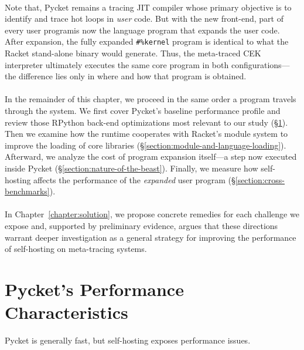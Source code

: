 	\paragraph{}%
		Note that, Pycket remains a tracing JIT compiler whose primary objective is to identify and trace hot loops in \emph{user} code. But with the new front-end, part of every \smartQL user program\smartQR is now the language program that expands the user code. After expansion, the fully expanded \verb|#%kernel| program is identical to what the Racket stand-alone binary would generate. Thus, the meta-traced CEK interpreter ultimately executes the same core program in both configurations—the difference lies only in where and how that program is obtained.

	\paragraph{}%
		In the remainder of this chapter, we proceed in the same order a program travels through the system. We first cover Pycket's baseline performance profile and review those RPython back-end optimizations most relevant to our study (\S\ref{section:pycket-performance-characteristics}). Then we examine how the runtime cooperates with Racket's module system to improve the loading of core libraries (\S\ref{section:module-and-language-loading}). Afterward, we analyze the cost of program expansion itself—a step now executed inside Pycket (\S\ref{section:nature-of-the-beast}). Finally, we measure how self-hosting affects the performance of the \emph{expanded} user program (\S\ref{section:cross-benchmarks}).

	\paragraph{}%
		In Chapter~\ref{chapter:solution}, we propose concrete remedies for each challenge we expose and, supported by preliminary evidence, argues that these directions warrant deeper investigation as a general strategy for improving the performance of self-hosting on meta-tracing systems.

	\section{Pycket's Performance Characteristics}
	\label{section:pycket-performance-characteristics}

	\begin{sectionpoint}
		Pycket is generally fast, but self-hosting exposes performance issues.
	\end{sectionpoint}

